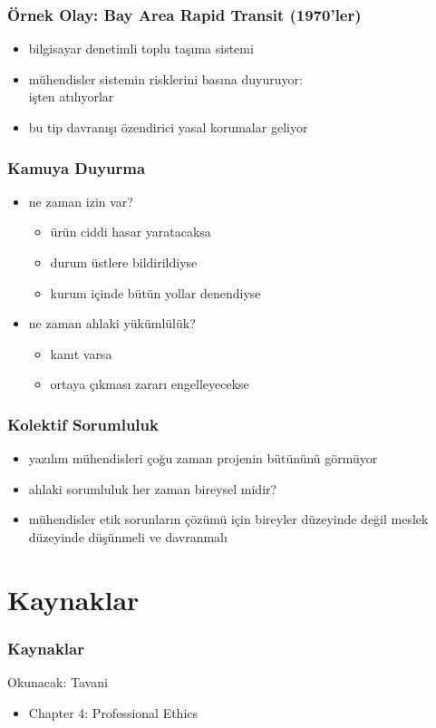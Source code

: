 \documentclass[dvipsnames]{beamer}
\theoremstyle{definition}
\theoremstyle{example}
\theoremstyle{plain}
\begin{document}
\begin{frame}
  \frametitle{Örnek Olay: Bay Area Rapid Transit (1970'ler)}

  \begin{itemize}
    \item bilgisayar denetimli toplu taşıma sistemi
    \item mühendisler sistemin risklerini basına duyuruyor:\\
      işten atılıyorlar

    \medskip
    \item bu tip davranışı özendirici yasal korumalar geliyor
  \end{itemize}
\end{frame}

\begin{frame}
  \frametitle{Kamuya Duyurma}

  \begin{itemize}
    \item ne zaman izin var?
    \begin{itemize}
      \item ürün ciddi hasar yaratacaksa
      \item durum üstlere bildirildiyse
      \item kurum içinde bütün yollar denendiyse
    \end{itemize}

    \pause
    \medskip
    \item ne zaman ahlaki yükümlülük?
    \begin{itemize}
      \item kanıt varsa
      \item ortaya çıkması zararı engelleyecekse
    \end{itemize}
  \end{itemize}
\end{frame}

\begin{frame}
  \frametitle{Kolektif Sorumluluk}

  \begin{itemize}
    \item yazılım mühendisleri çoğu zaman projenin bütününü görmüyor

    \pause
    \item ahlaki sorumluluk her zaman bireysel midir?

    \pause
    \item mühendisler etik sorunların çözümü için bireyler
      düzeyinde değil meslek düzeyinde düşünmeli ve
      davranmalı
  \end{itemize}
\end{frame}

\section*{Kaynaklar}

\begin{frame}
  \frametitle{Kaynaklar}

  \begin{block}{Okunacak: Tavani}
    \begin{itemize}
      \item Chapter 4: \alert{Professional Ethics}
    \end{itemize}
  \end{block}
\end{frame}
\end{document}
